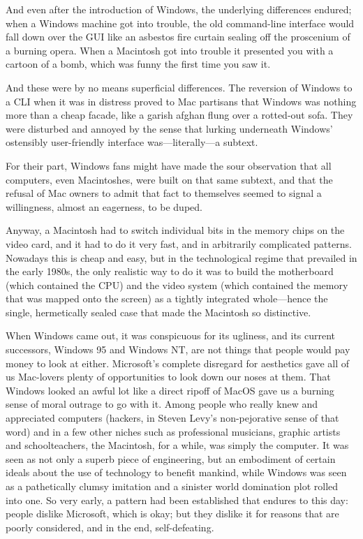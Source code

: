 \documentclass[
  fontsize=11pt,
  paper=landscape,
  twocolumn=true,
  pagesize=pdftex,
  headings=small,
  DIV=15,
  ]{scrartcl}
\begin{document}
And even after the introduction of Windows, the underlying differences
endured; when a Windows machine got into trouble, the old command-line
interface would fall down over the GUI like an asbestos fire curtain
sealing off the proscenium of a burning opera. When a Macintosh got into
trouble it presented you with a cartoon of a bomb, which was funny the
first time you saw it.

And these were by no means superficial differences. The reversion of
Windows to a CLI when it was in distress proved to Mac partisans that
Windows was nothing more than a cheap facade, like a garish afghan flung
over a rotted-out sofa. They were disturbed and annoyed by the sense
that lurking underneath Windows' ostensibly user-friendly interface
was---literally---a subtext.

For their part, Windows fans might have made the sour observation that
all computers, even Macintoshes, were built on that same subtext, and
that the refusal of Mac owners to admit that fact to themselves seemed
to signal a willingness, almost an eagerness, to be duped.

Anyway, a Macintosh had to switch individual bits in the memory chips on
the video card, and it had to do it very fast, and in arbitrarily
complicated patterns. Nowadays this is cheap and easy, but in the
technological regime that prevailed in the early 1980s, the only
realistic way to do it was to build the motherboard (which contained the
CPU) and the video system (which contained the memory that was mapped
onto the screen) as a tightly integrated whole---hence the single,
hermetically sealed case that made the Macintosh so distinctive.

When Windows came out, it was conspicuous for its ugliness, and its
current successors, Windows 95 and Windows NT, are not things that
people would pay money to look at either. Microsoft's complete disregard
for aesthetics gave all of us Mac-lovers plenty of opportunities to look
down our noses at them. That Windows looked an awful lot like a direct
ripoff of MacOS gave us a burning sense of moral outrage to go with it.
Among people who really knew and appreciated computers (hackers, in
Steven Levy's non-pejorative sense of that word) and in a few other
niches such as professional musicians, graphic artists and
schoolteachers, the Macintosh, for a while, was simply the computer. It
was seen as not only a superb piece of engineering, but an embodiment of
certain ideals about the use of technology to benefit mankind, while
Windows was seen as a pathetically clumsy imitation and a sinister world
domination plot rolled into one. So very early, a pattern had been
established that endures to this day: people dislike Microsoft, which is
okay; but they dislike it for reasons that are poorly considered, and in
the end, self-defeating.
\end{document}
